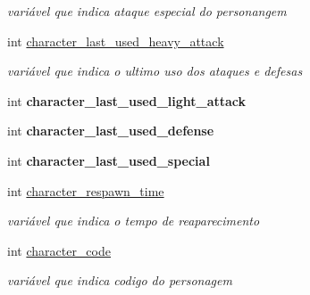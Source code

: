\begin{DoxyCompactItemize}
\begin{DoxyCompactList}\small\item\em variável que indica ataque especial do personangem \end{DoxyCompactList}\item 
\mbox{\label{classCharacter_a44cde6bc401f387f821d574a31d3bd23}} 
int \mbox{\hyperlink{classCharacter_a44cde6bc401f387f821d574a31d3bd23}{character\+\_\+last\+\_\+used\+\_\+heavy\+\_\+attack}}
\begin{DoxyCompactList}\small\item\em variável que indica o ultimo uso dos ataques e defesas \end{DoxyCompactList}\item 
\mbox{\label{classCharacter_a279b7d863c09ae1c6df3aac72db2ca24}} 
int {\bfseries character\+\_\+last\+\_\+used\+\_\+light\+\_\+attack}
\item 
\mbox{\label{classCharacter_aaee6eae1e5b981ddc2bed6823c5cfe68}} 
int {\bfseries character\+\_\+last\+\_\+used\+\_\+defense}
\item 
\mbox{\label{classCharacter_a860b333991b5e12062cfafd164588719}} 
int {\bfseries character\+\_\+last\+\_\+used\+\_\+special}
\item 
\mbox{\label{classCharacter_a87615038725b126168eaf4f47fd60836}} 
int \mbox{\hyperlink{classCharacter_a87615038725b126168eaf4f47fd60836}{character\+\_\+respawn\+\_\+time}}
\begin{DoxyCompactList}\small\item\em variável que indica o tempo de reaparecimento \end{DoxyCompactList}\item 
\mbox{\label{classCharacter_a3e16e9cb23edc78d774cf30925242a8e}} 
int \mbox{\hyperlink{classCharacter_a3e16e9cb23edc78d774cf30925242a8e}{character\+\_\+code}}
\begin{DoxyCompactList}\small\item\em variável que indica codigo do personagem \end{DoxyCompactList}\item 
\mbox{\label{classCharacter_a8fdf09c04765a29d63a1e92620c312bb}} 

\end{DoxyCompactItemize}

